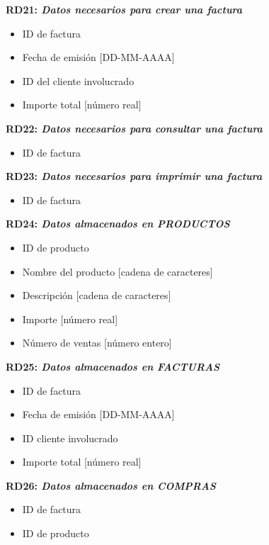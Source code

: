 \documentclass[paper=a4, fontsize=11pt, spanish]{scrartcl}
\begin{document}
\setlength{\parindent}{0em}
\textbf{RD21: \textit{Datos necesarios para crear una factura}}
\setlength{\parindent}{2em}
\begin{itemize}
  \item ID de factura
  \item Fecha de emisión [DD-MM-AAAA]
  \item ID del cliente involucrado
  \item Importe total [número real]
\end{itemize}

\setlength{\parindent}{0em}
\textbf{RD22: \textit{Datos necesarios para consultar una factura}}
\setlength{\parindent}{2em}
\begin{itemize}
  \item ID de factura
\end{itemize}

\setlength{\parindent}{0em}
\textbf{RD23: \textit{Datos necesarios para imprimir una factura}}
\setlength{\parindent}{2em}
\begin{itemize}
  \item ID de factura
\end{itemize}

\setlength{\parindent}{0em}
\textbf{RD24: \textit{Datos almacenados en PRODUCTOS}}
\setlength{\parindent}{2em}
\begin{itemize}
  \item ID de producto
  \item Nombre del producto [cadena de caracteres]
  \item Descripción [cadena de caracteres]
  \item Importe [número real]
  \item Número de ventas [número entero]
\end{itemize}

\setlength{\parindent}{0em}
\textbf{RD25: \textit{Datos almacenados en FACTURAS}}
\setlength{\parindent}{2em}
\begin{itemize}
  \item ID de factura
  \item Fecha de emisión [DD-MM-AAAA]
  \item ID cliente involucrado
  \item Importe total [número real]
\end{itemize}

\setlength{\parindent}{0em}
\textbf{RD26: \textit{Datos almacenados en COMPRAS}}
\setlength{\parindent}{2em}
\begin{itemize}
  \item ID de factura
  \item ID de producto
\end{itemize}
\end{document}
